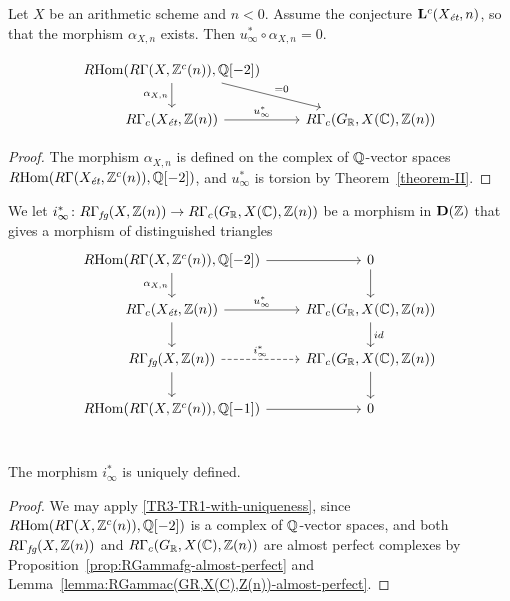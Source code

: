 \documentclass{article}
\numberwithin{equation}{section}
\begin{document}
\begin{lemma}
  Let $X$ be an arithmetic scheme and $n < 0$. Assume the conjecture
  $\mathbf{L}^c (X_\et, n)$, so that the morphism $\alpha_{X,n}$ exists.
  Then $u_\infty^* \circ \alpha_{X,n} = 0$.

  \[ \begin{tikzcd}
    \RHom (R\Gamma (X, \ZZ^c (n)), \QQ [-2]) \ar{d}[swap]{\alpha_{X,n}}\ar{dr}{= 0} \\
      R\Gamma_c (X_\et, \ZZ (n)) \ar{r}{u_\infty^*} & R\Gamma_c (G_\RR, X (\CC), \ZZ (n))
    \end{tikzcd} \]

  \begin{proof}
    The morphism $\alpha_{X,n}$ is defined on the complex of $\QQ$-vector spaces
    $\RHom (R\Gamma (X_\et, \ZZ^c (n)), \QQ [-2])$, and $u_\infty^*$ is torsion
    by Theorem~\ref{theorem-II}.
  \end{proof}
\end{lemma}

\begin{definition}
  We let
  $i_\infty^*\colon R\Gamma_\fg (X, \ZZ (n)) \to R\Gamma_c (G_\RR, X (\CC), \ZZ (n))$
  be a morphism in $\mathbf{D} (\ZZ)$ that gives a morphism of distinguished
  triangles
  \begin{equation}
    \label{eqn:triangle-defining-i-infty}
    \begin{tikzcd}
      \RHom (R\Gamma (X, \ZZ^c (n)), \QQ [-2]) \ar{d}[swap]{\alpha_{X,n}}\ar{r} & 0\ar{d} \\
      R\Gamma_c (X_\et, \ZZ (n)) \ar{r}{u_\infty^*}\ar{d} &  R\Gamma_c (G_\RR, X (\CC), \ZZ (n)) \ar{d}{id} \\
      R\Gamma_\fg (X, \ZZ (n)) \ar[dashed]{r}{i_\infty^*}\ar{d} & R\Gamma_c (G_\RR, X (\CC), \ZZ (n)) \ar{d} \\
      \RHom (R\Gamma (X, \ZZ^c (n)), \QQ [-1])\ar{r} & 0 \\
    \end{tikzcd}
  \end{equation}
\end{definition}

\begin{proposition}
  \label{prop:uniqueness-of-i-infty}
  The morphism $i_\infty^*$ is uniquely defined.

  \begin{proof}
    We may apply \ref{TR3-TR1-with-uniqueness}, since
    $\RHom (R\Gamma (X, \ZZ^c (n)), \QQ [-2])$ is a complex of $\QQ$-vector
    spaces, and both
    $R\Gamma_\fg (X, \ZZ (n))$ and
    $R\Gamma_c (G_\RR, X (\CC), \ZZ (n))$
    are almost perfect complexes by
    Proposition~\ref{prop:RGammafg-almost-perfect} and
    Lemma~\ref{lemma:RGammac(GR,X(C),Z(n))-almost-perfect}.
  \end{proof}
\end{proposition}
\end{document}
